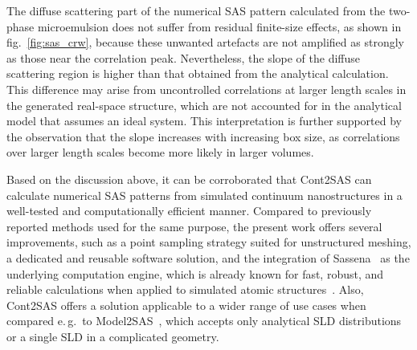 \documentclass[preprint, 5p, times, twocolumn]{elsarticle}
\begin{document}
The diffuse scattering part of the numerical SAS pattern calculated from the two-phase microemulsion does not suffer from residual finite-size effects, as shown in fig.~\ref{fig:sas_crw}, because these unwanted artefacts are not amplified as strongly as those near the correlation peak. Nevertheless, the slope of the diffuse scattering region is higher than that obtained from the analytical calculation. This difference may arise from uncontrolled correlations at larger length scales in the generated real-space structure, which are not accounted for in the analytical model that assumes an ideal system. This interpretation is further supported by the observation that the slope increases with increasing box size, as correlations over larger length scales become more likely in larger volumes.




Based on the discussion above, it can be corroborated that Cont2SAS can calculate numerical SAS patterns from simulated continuum nanostructures in a well-tested and computationally efficient manner. Compared to previously reported methods used for the same purpose, the present work offers several improvements, such as a point sampling strategy suited for unstructured meshing, a dedicated and reusable software solution, and the integration of Sassena~\cite{sassena} as the underlying computation engine, which is already known for fast, robust, and reliable calculations when applied to simulated atomic structures~\cite{reich2022comparison, majumdar2024computation}. Also, Cont2SAS offers a solution applicable to a wider range of use cases when compared e.\,g.\ to Model2SAS~\cite{li2022model2sas}, which accepts only analytical SLD distributions or a single SLD in a complicated geometry.
\end{document}
